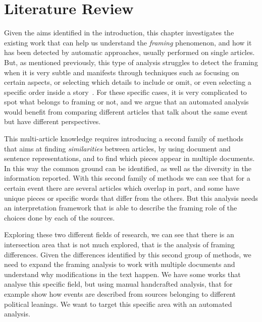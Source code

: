 \chapter{Literature Review}
\label{chap:literature_review}



Given the aims identified in the introduction, this chapter investigates the existing work that can help us understand the \emph{framing} phenomenon, and how it has been detected by automatic approaches, usually performed on single articles.
But, as mentioned previously, this type of analysis struggles to detect the framing when it is very subtle and manifests through techniques such as focusing on certain aspects, or selecting which details to include or omit, or even selecting a specific order inside a story~\cite{morstatter2018identifying}.
For these specific cases, it is very complicated to spot what belongs to framing or not, and we argue that an automated analysis would benefit from comparing different articles that talk about the same event but have different perspectives. %

This multi-article knowledge requires introducing a second family of methods that aims at finding \emph{similarities} between articles, by using document and sentence representations, and to find which pieces appear in multiple documents. In this way the common ground can be identified, as well as the diversity in the information reported.
With this second family of methods we can see that for a certain event there are several articles which overlap in part, and some have unique pieces or specific words that differ from the others. But this analysis needs an interpretation framework that is able to describe the framing role of the choices done by each of the sources.

Exploring these two different fields of research, we can see that there is an intersection area that is not much explored, that is the analysis of framing differences. Given the differences identified by this second group of methods, we need to expand the framing analysis to work with multiple documents and understand why modifications in the text happen.
We have some works that analyse this specific field, but using manual handcrafted analysis, that for example show how events are described from sources belonging to different political leanings. We want to target this specific area with an automated analysis.

